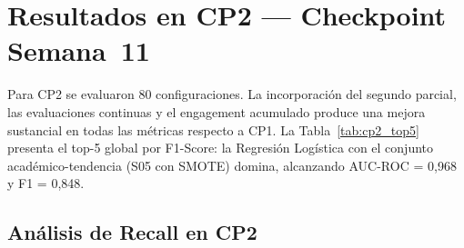 \documentclass[12pt, letterpaper, openany]{report}
\begin{document}
\FloatBarrier

\section{Resultados en CP2 --- Checkpoint Semana~11}

Para CP2 se evaluaron 80 configuraciones. La incorporación del segundo parcial, las evaluaciones continuas y el engagement acumulado produce una mejora sustancial en todas las métricas respecto a CP1. La Tabla~\ref{tab:cp2_top5} presenta el top-5 global por F1-Score: la Regresión Logística con el conjunto académico-tendencia (S05 con SMOTE) domina, alcanzando AUC-ROC = 0,968 y F1 = 0,848.

\begin{table}[!htbp]
  \centering
  \caption{Cinco mejores configuraciones globales por F1-Score en CP2 (80 experimentos, AUC-ROC $\geq 0{,}75$). La Regresión Logística con el conjunto académico-tendencia (S05 + SMOTE) domina. Los AUC-ROC en CP2 ($> 0{,}95$) son sustancialmente mayores que en CP1 ($\approx 0{,}84$), reflejando el mayor poder discriminativo disponible en la semana~11.}
  \label{tab:cp2_top5}
  \small
\end{table}

\FloatBarrier

\subsection{Análisis de Recall en CP2}
\end{document}
